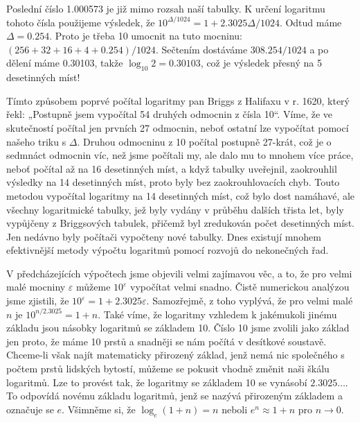     Poslední číslo \num{1.000573} je již mimo rozsah naší tabulky. K určení logaritmu tohoto čísla
    použijeme výsledek, že \(10^{\Delta/1024} = 1 +\num{2.3025} \Delta/1024\). Odtud máme
    \(\Delta=\num{0.254}\). Proto je třeba 10 umocnit na tuto mocninu: \((\num{256} + \num{32} +
    \num{16} + \num{4} + \num{0.254})/1024\). Sečtením dostáváme \(\num{308.254}/1024\) a po dělení
    máme \num{0.30103}, takže \(\log_{10}2 = \num{0.30103}\), což je výsledek přesný na \num{5}
    desetinných míst!

    Tímto způsobem poprvé počítal logaritmy pan Briggs z Halifaxu v r. 1620, který řekl: „Postupně
    jsem vypočítal \num{54} druhých odmocnin z čísla \num{10}“. Víme, že ve skutečností počítal jen
    prvních \num{27} odmocnin, neboť ostatní lze vypočítat pomocí našeho triku s \(\Delta\). Druhou
    odmocninu z \num{10} počítal postupně \num{27}-krát, což je o sedmnáct odmocnin víc, než jsme
    počítali my, ale dalo mu to mnohem více práce, neboť počítal až na \num{16} desetinných míst, a
    když tabulky uveřejnil, zaokrouhlil výsledky na 14 desetinných míst, proto byly bez
    zaokrouhlovacích chyb. Touto metodou vypočítal logaritmy na \num{14} desetinných míst, což bylo
    dost namáhavé, ale všechny logaritmické tabulky, jež byly vydány v průběhu dalších třista let,
    byly vypůjčeny z Briggsových tabulek, přičemž byl zredukován počet desetinných míst. Jen nedávno
    byly počítači vypočteny nové tabulky. Dnes existují mnohem efektivnější metody výpočtu logaritmů
    pomocí rozvojů do nekonečných řad.

    V předcházejících výpočtech jsme objevili velmi zajímavou věc, a to, že pro velmi malé mocniny
    \(\varepsilon\) můžeme \(10^\varepsilon\) vypočítat velmi snadno. Čistě numerickou analýzou jsme
    zjistili, že \(10^\varepsilon=1 + \num{2.3025}\varepsilon\). Samozřejmě, z toho vyplývá, že pro
    velmi malé \(n\) je \(10^{n/\num{2.3025}} =1 + n\). Také víme, že logaritmy vzhledem k
    jakémukoli jinému základu jsou násobky logaritmů se základem \num{10}. Číslo \num{10} jsme
    zvolili jako základ jen proto, že máme \num{10} prstů a snadněji se nám počítá v desítkové
    soustavě. Chceme-li však najít matematicky přirozený základ, jenž nemá nic společného s počtem
    prstů lidských bytostí, můžeme se pokusit vhodně změnit naši škálu logaritmů. Lze to provést
    tak, že logaritmy se základem \num{10} se vynásobí \(\num{2.3025}\ldots\). To odpovídá novému
    základu logaritmů, jenž se nazývá přirozeným základem a označuje se \(e\). Všimněme si, že
    \(\log_e(1 + n) = n\) neboli \(e^n \approx 1+n\) pro \(n\rightarrow0\).


